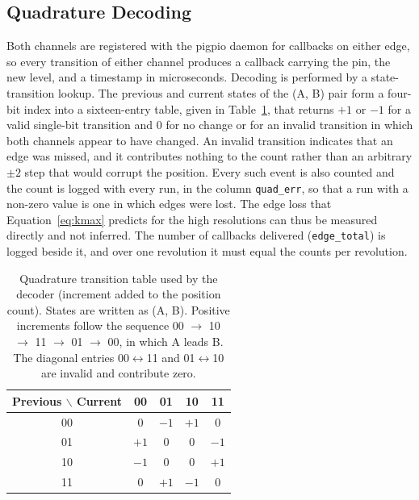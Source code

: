 
\subsection{Quadrature Decoding}
\label{subsec:agit-quad}

Both channels are registered with the pigpio daemon for callbacks on either edge, so every transition of either channel produces a callback carrying the pin, the new level, and a timestamp in microseconds. Decoding is performed by a state-transition lookup. The previous and current states of the (A, B) pair form a four-bit index into a sixteen-entry table, given in Table~\ref{tab:quad}, that returns $+1$ or $-1$ for a valid single-bit transition and $0$ for no change or for an invalid transition in which both channels appear to have changed. An invalid transition indicates that an edge was missed, and it contributes nothing to the count rather than an arbitrary $\pm 2$ step that would corrupt the position. Every such event is also counted and the count is logged with every run, in the column \texttt{quad\_err}, so that a run with a non-zero value is one in which edges were lost. The edge loss that Equation~\ref{eq:kmax} predicts for the high resolutions can thus be measured directly and not inferred. The number of callbacks delivered (\texttt{edge\_total}) is logged beside it, and over one revolution it must equal the counts per revolution.

\begin{table}[htbp]
    \centering
    \caption[Quadrature transition table]{Quadrature transition table used by the decoder (increment added to the position count). States are written as (A, B). Positive increments follow the sequence 00 $\rightarrow$ 10 $\rightarrow$ 11 $\rightarrow$ 01 $\rightarrow$ 00, in which A leads B. The diagonal entries 00$\leftrightarrow$11 and 01$\leftrightarrow$10 are invalid and contribute zero.}
    \label{tab:quad}
    \begin{tabular}{@{}c|cccc@{}}
        \toprule
        Previous $\backslash$ Current & 00 & 01 & 10 & 11 \\
        \midrule
        00 & 0 & $-1$ & $+1$ & 0 \\
        01 & $+1$ & 0 & 0 & $-1$ \\
        10 & $-1$ & 0 & 0 & $+1$ \\
        11 & 0 & $+1$ & $-1$ & 0 \\
        \bottomrule
    \end{tabular}
\end{table}

